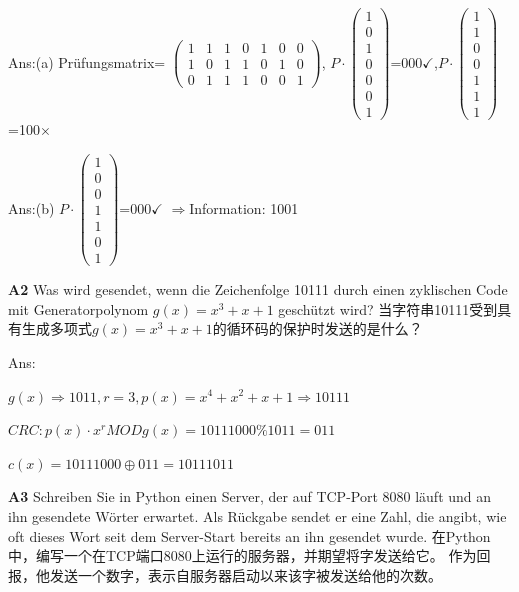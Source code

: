 \documentclass[fleqn]{article}
\begin{document}
\qquad Ans:(a) Prüfungsmatrix= 
$\begin{pmatrix}
    1&1&1&0&1&0&0\\
    1&0&1&1&0&1&0\\
    0&1&1&1&0&0&1
\end{pmatrix}
$,
$P\cdot \begin{pmatrix}
    1\\0\\1\\0\\0\\0\\1
\end{pmatrix}$=000$\checkmark$,$P\cdot\begin{pmatrix}
    1\\1\\0\\0\\1\\1\\1
\end{pmatrix}$=100$\times$

\qquad Ans:(b) $P\cdot\begin{pmatrix}
    1\\0\\0\\1\\1\\0\\1
\end{pmatrix}$=000$\checkmark$ $\Rightarrow$Information: 1001

\noindent\textbf{A2} Was wird gesendet, wenn die Zeichenfolge 10111 durch einen zyklischen Code mit Generatorpolynom $g(x)=x^3+x+1$ geschützt wird? 当字符串10111受到具有生成多项式$g(x)=x^3+x+1$的循环码的保护时发送的是什么？

\quad Ans:

\qquad $g(x)\Rightarrow1011, r=3,p(x)=x^4+x^2+x+1\Rightarrow10111$

\qquad $CRC:p(x)\cdot x^r MOD g(x) = 10111000 \% 1011 = 011 $

\qquad $c(x) = 10111000\oplus 011 = 10111011$

\noindent\textbf{A3} Schreiben Sie in Python einen Server, der auf TCP-Port 8080 läuft und an ihn gesendete Wörter erwartet. Als Rückgabe sendet er eine Zahl, die angibt, wie oft dieses Wort seit dem Server-Start bereits an ihn gesendet wurde. 在Python中，编写一个在TCP端口8080上运行的服务器，并期望将字发送给它。 作为回报，他发送一个数字，表示自服务器启动以来该字被发送给他的次数。
\end{document}
